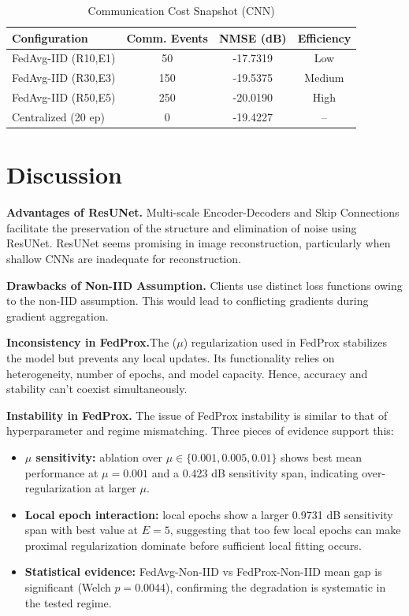 \documentclass{llncs}
\begin{document}
\begin{table}[htbp]
\caption{Communication Cost Snapshot (CNN)}
\label{tab:comm}
\centering
\begin{tabular}{lccc}
\toprule
Configuration & Comm. Events & NMSE (dB) & Efficiency \\
\midrule
FedAvg-IID (R10,E1) & 50 & -17.7319 & Low \\
FedAvg-IID (R30,E3) & 150 & -19.5375 & Medium \\
FedAvg-IID (R50,E5) & 250 & -20.0190 & High \\
Centralized (20 ep) & 0 & -19.4227 & -- \\
\bottomrule
\end{tabular}
\end{table}


\section{Discussion}

\textbf{Advantages of ResUNet.} Multi-scale Encoder-Decoders and Skip Connections facilitate the preservation of the structure and elimination of noise using ResUNet. ResUNet seems promising in image reconstruction, particularly when shallow CNNs are inadequate for reconstruction.

\textbf{Drawbacks of Non-IID Assumption.} Clients use distinct loss functions owing to the non-IID assumption. This would lead to conflicting gradients during gradient aggregation.

\textbf{Inconsistency in FedProx.}The ($\mu$) regularization  used in FedProx stabilizes the model but prevents any local updates. Its functionality relies on heterogeneity, number of epochs, and model capacity. Hence, accuracy and stability can’t coexist simultaneously.

\textbf{Instability in FedProx.} The issue of FedProx instability is similar to that of hyperparameter and regime mismatching. Three pieces of evidence support this:
\begin{itemize}
    \item \textbf{$\mu$ sensitivity:} ablation over $\mu\in\{0.001,0.005,0.01\}$ shows best mean performance at $\mu=0.001$ and a 0.423 dB sensitivity span, indicating over-regularization at larger $\mu$.
    \item \textbf{Local epoch interaction:} local epochs show a larger 0.9731 dB sensitivity span with best value at $E=5$, suggesting that too few local epochs can make proximal regularization dominate before sufficient local fitting occurs.
    \item \textbf{Statistical evidence:} FedAvg-Non-IID vs FedProx-Non-IID mean gap is significant (Welch $p=0.0044$), confirming the degradation is systematic in the tested regime.
\end{itemize}
\end{document}
